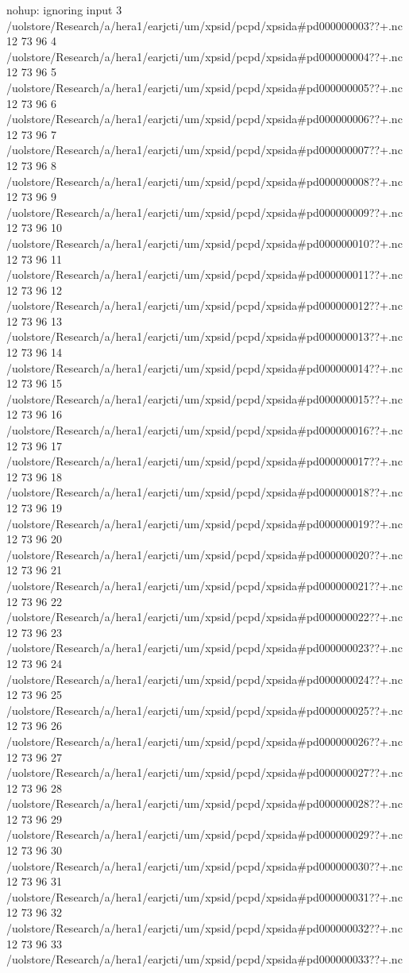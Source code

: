 nohup: ignoring input
3
/uolstore/Research/a/hera1/earjcti/um/xpsid/pcpd/xpsida#pd000000003??+.nc
12 73 96
4
/uolstore/Research/a/hera1/earjcti/um/xpsid/pcpd/xpsida#pd000000004??+.nc
12 73 96
5
/uolstore/Research/a/hera1/earjcti/um/xpsid/pcpd/xpsida#pd000000005??+.nc
12 73 96
6
/uolstore/Research/a/hera1/earjcti/um/xpsid/pcpd/xpsida#pd000000006??+.nc
12 73 96
7
/uolstore/Research/a/hera1/earjcti/um/xpsid/pcpd/xpsida#pd000000007??+.nc
12 73 96
8
/uolstore/Research/a/hera1/earjcti/um/xpsid/pcpd/xpsida#pd000000008??+.nc
12 73 96
9
/uolstore/Research/a/hera1/earjcti/um/xpsid/pcpd/xpsida#pd000000009??+.nc
12 73 96
10
/uolstore/Research/a/hera1/earjcti/um/xpsid/pcpd/xpsida#pd000000010??+.nc
12 73 96
11
/uolstore/Research/a/hera1/earjcti/um/xpsid/pcpd/xpsida#pd000000011??+.nc
12 73 96
12
/uolstore/Research/a/hera1/earjcti/um/xpsid/pcpd/xpsida#pd000000012??+.nc
12 73 96
13
/uolstore/Research/a/hera1/earjcti/um/xpsid/pcpd/xpsida#pd000000013??+.nc
12 73 96
14
/uolstore/Research/a/hera1/earjcti/um/xpsid/pcpd/xpsida#pd000000014??+.nc
12 73 96
15
/uolstore/Research/a/hera1/earjcti/um/xpsid/pcpd/xpsida#pd000000015??+.nc
12 73 96
16
/uolstore/Research/a/hera1/earjcti/um/xpsid/pcpd/xpsida#pd000000016??+.nc
12 73 96
17
/uolstore/Research/a/hera1/earjcti/um/xpsid/pcpd/xpsida#pd000000017??+.nc
12 73 96
18
/uolstore/Research/a/hera1/earjcti/um/xpsid/pcpd/xpsida#pd000000018??+.nc
12 73 96
19
/uolstore/Research/a/hera1/earjcti/um/xpsid/pcpd/xpsida#pd000000019??+.nc
12 73 96
20
/uolstore/Research/a/hera1/earjcti/um/xpsid/pcpd/xpsida#pd000000020??+.nc
12 73 96
21
/uolstore/Research/a/hera1/earjcti/um/xpsid/pcpd/xpsida#pd000000021??+.nc
12 73 96
22
/uolstore/Research/a/hera1/earjcti/um/xpsid/pcpd/xpsida#pd000000022??+.nc
12 73 96
23
/uolstore/Research/a/hera1/earjcti/um/xpsid/pcpd/xpsida#pd000000023??+.nc
12 73 96
24
/uolstore/Research/a/hera1/earjcti/um/xpsid/pcpd/xpsida#pd000000024??+.nc
12 73 96
25
/uolstore/Research/a/hera1/earjcti/um/xpsid/pcpd/xpsida#pd000000025??+.nc
12 73 96
26
/uolstore/Research/a/hera1/earjcti/um/xpsid/pcpd/xpsida#pd000000026??+.nc
12 73 96
27
/uolstore/Research/a/hera1/earjcti/um/xpsid/pcpd/xpsida#pd000000027??+.nc
12 73 96
28
/uolstore/Research/a/hera1/earjcti/um/xpsid/pcpd/xpsida#pd000000028??+.nc
12 73 96
29
/uolstore/Research/a/hera1/earjcti/um/xpsid/pcpd/xpsida#pd000000029??+.nc
12 73 96
30
/uolstore/Research/a/hera1/earjcti/um/xpsid/pcpd/xpsida#pd000000030??+.nc
12 73 96
31
/uolstore/Research/a/hera1/earjcti/um/xpsid/pcpd/xpsida#pd000000031??+.nc
12 73 96
32
/uolstore/Research/a/hera1/earjcti/um/xpsid/pcpd/xpsida#pd000000032??+.nc
12 73 96
33
/uolstore/Research/a/hera1/earjcti/um/xpsid/pcpd/xpsida#pd000000033??+.nc
